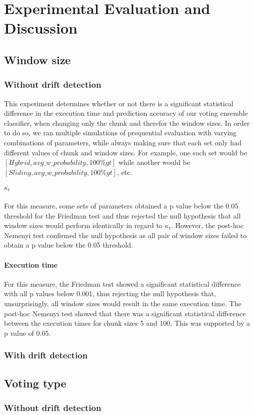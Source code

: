 
\chapter{Experimental Evaluation and Discussion} %

\label{Chapter5} %

\section{Window size}
\subsection{Without drift detection}
This experiment determines whether or not there is a significant statistical difference in the execution time and prediction accuracy of our voting ensemble classifier, when changing only the chunk and therefor the window sizes. In order to do so, we ran multiple simulations of prequential evaluation with varying combinations of parameters, while always making sure that each set only had different values of chunk and window sizes.
For example, one such set would be $[Hybrid,avg\_w\_probability,100\%gt]$ while another would be $[Sliding,avg\_w\_probability,100\%gt]$, etc.

\subsubsection{$\kappa_t$}
For this measure, some sets of parameters obtained a p value below the 0.05 threshold for the Friedman test and thus rejected the null hypothesis that all window sizes would perform identically in regard to $\kappa_t$. However, the post-hoc Nemenyi test confirmed the null hypothesis as all pair of window sizes failed to obtain a p value below the 0.05 threshold.

\subsubsection{Execution time}
For this measure, the Friedman test showed a significant statistical difference with all p values below 0.001, thus rejecting the null hypothesis that, unsurprisingly, all window sizes would result in the same execution time. The post-hoc Nemenyi test showed that there was a significant statistical difference between the execution times for chunk sizes 5 and 100. This was supported by a p value of 0.05.

\subsection{With drift detection}

\section{Voting type}
\subsection{Without drift detection}
